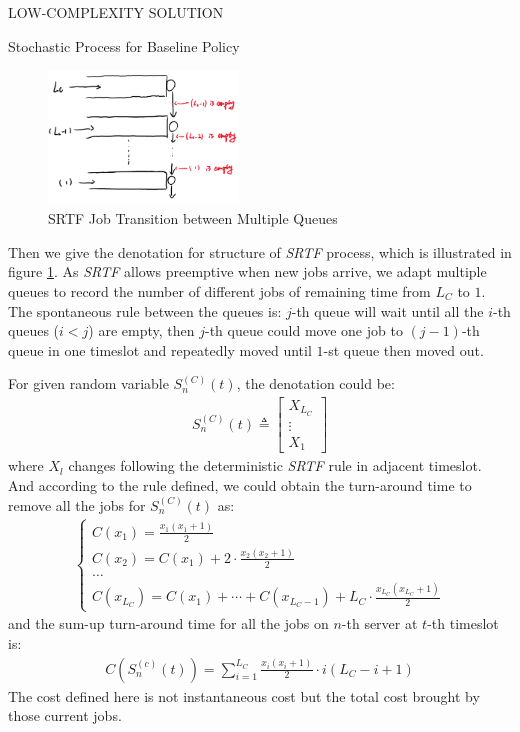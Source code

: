 \documentclass[10pt, conference, letterpaper]{IEEEtran}
\begin{document}
\begin{section}{LOW-COMPLEXITY SOLUTION}
\begin{subsection}{Stochastic Process for Baseline Policy}
            \begin{figure}[ht]
                \centering
                \includegraphics[width=0.45\textwidth]{srtf-graph.png}
                \caption{SRTF Job Transition between Multiple Queues}
                \label{fig:srtf}
            \end{figure}
            Then we give the denotation for structure of \emph{SRTF} process, which is illustrated in figure \ref{fig:srtf}. As \emph{SRTF} allows preemptive when new jobs arrive, we adapt multiple queues to record the number of different jobs of remaining time from $L_C$ to $1$. The spontaneous rule between the queues is: $j$-th queue will wait until all the $i$-th queues ($i < j$) are empty, then $j$-th queue could move one job to $(j-1)$-th queue in one timeslot and repeatedly moved until $1$-st queue then moved out.

            For given random variable $S^{(C)}_{n}(t)$, the denotation could be:
            \begin{align}
                S^{(C)}_{n}(t) \triangleq \begin{bmatrix}
                    X_{L_C} \\ \vdots \\X_{1}
                \end{bmatrix}
            \end{align}
            where $X_{l}$ changes following the deterministic \emph{SRTF} rule in adjacent timeslot. And according to the rule defined, we could obtain the turn-around time to remove all the jobs for $S^{(C)}_{n}(t)$ as:
            \begin{align}
                \begin{cases}
                    C(x_{1}) = \frac{x_1(x_1+1)}{2}
                    \\
                    C(x_{2}) = C(x_{1}) + 2 \cdot \frac{x_2(x_2+1)}{2}
                    \\
                    \dots
                    \\
                    C(x_{L_C}) = C(x_{1}) + \cdots + C(x_{L_C-1}) + L_C \cdot \frac{x_{L_C}(x_{L_C}+1)}{2}
                \end{cases}
            \end{align}
            and the sum-up turn-around time for all the jobs on $n$-th server at $t$-th timeslot is:
            \begin{align}
                C(S^{(c)}_{n}(t)) = \sum_{i=1}^{L_C} \frac{x_i(x_i+1)}{2} \cdot i(L_C-i+1)
            \end{align}
            The cost defined here is not instantaneous cost but the total cost brought by those current jobs.


\end{subsection}
\end{section}
\end{document}
